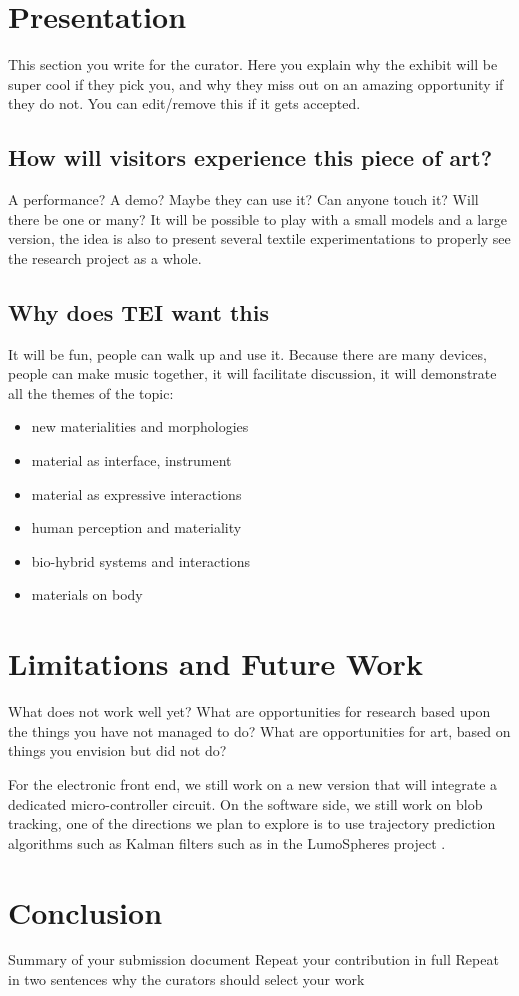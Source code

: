 \documentclass{sigchi-ext}
\begin{document}
\section{Presentation}

This section you write for the curator. Here you explain why the exhibit will be super cool if they pick you, and why they miss out on an amazing opportunity if they do not. You can edit/remove this if it gets accepted.


\subsection{How will visitors experience this piece of art?}
A performance? A demo? Maybe they can use it? Can anyone touch it? Will there be one or many?
It will be possible to play with a small models and a large version, the idea is also to present several textile experimentations to properly see the research project as a whole.


\subsection{Why does TEI want this}
It will be fun, people can walk up and use it. Because there are many devices, people can make music together, it will facilitate discussion, it will demonstrate all the themes of the topic:
\begin{itemize}
\item new materialities and morphologies
\item material as interface, instrument
\item material as expressive interactions
\item human perception and materiality
\item bio-hybrid systems and interactions
\item materials on body
\end{itemize}


\section{Limitations and Future Work}

What does not work well yet?
What are opportunities for research based upon the things you have not managed to do?
What are opportunities for art, based on things you envision but did not do?

For the electronic front end, we still work on a new version that will integrate a dedicated micro-controller circuit.
On the software side, we still work on blob tracking, one of the directions we plan to explore is to use trajectory prediction algorithms such as Kalman filters such as in the LumoSpheres project \cite{lumospheres}.


\section{Conclusion}
Summary of your submission document
Repeat your contribution in full
Repeat in two sentences why the curators should select your work

\balance{}



\end{document}
